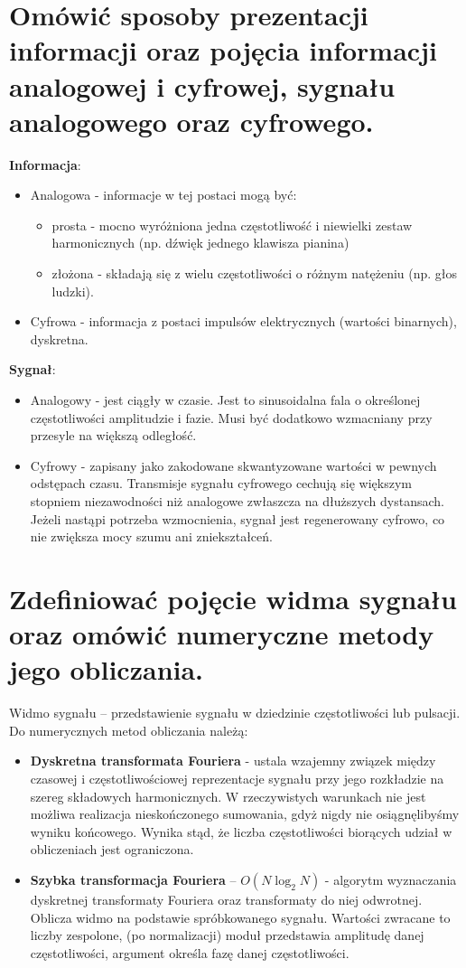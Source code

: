 \documentclass[12pt,a4paper]{article}
\begin{document}
	\section{Omówić sposoby prezentacji informacji oraz pojęcia informacji analogowej i cyfrowej, sygnału analogowego oraz cyfrowego.}
	\textbf{Informacja}:
	\begin{itemize}
		\item Analogowa - informacje w tej postaci mogą być:
		\begin{itemize}
			\item prosta - mocno wyróżniona jedna częstotliwość i niewielki zestaw harmonicznych (np. dźwięk jednego klawisza pianina)
			\item złożona - składają się z wielu częstotliwości o różnym natężeniu (np. głos ludzki).
		\end{itemize}
		\item Cyfrowa - informacja z postaci impulsów elektrycznych (wartości binarnych), dyskretna.
	\end{itemize}
	\textbf{Sygnał}:
	\begin{itemize}
		\item Analogowy - jest ciągły w czasie. Jest to sinusoidalna fala o określonej częstotliwości amplitudzie i fazie. Musi być dodatkowo wzmacniany przy przesyle na większą odległość.
		\item Cyfrowy - zapisany jako zakodowane skwantyzowane wartości w pewnych odstępach czasu. Transmisje sygnału cyfrowego cechują się większym stopniem niezawodności niż analogowe zwłaszcza na dłuższych dystansach. Jeżeli nastąpi potrzeba wzmocnienia, sygnał jest regenerowany cyfrowo, co nie zwiększa mocy szumu ani zniekształceń.
	\end{itemize}


	\section{Zdefiniować pojęcie widma sygnału oraz omówić numeryczne metody jego obliczania.}
	Widmo sygnału – przedstawienie sygnału w dziedzinie częstotliwości lub pulsacji. Do numerycznych metod obliczania należą:
	\begin{itemize}
		\item \textbf{Dyskretna transformata Fouriera} - ustala wzajemny związek między czasowej i częstotliwościowej reprezentacje sygnału przy jego  rozkładzie na szereg składowych harmonicznych. W rzeczywistych warunkach nie jest możliwa realizacja nieskończonego sumowania, gdyż nigdy nie osiągnęlibyśmy wyniku końcowego.
Wynika stąd, że liczba częstotliwości biorących udział w obliczeniach jest ograniczona.
		\item \textbf{Szybka transformacja Fouriera} – $O(N\log _{2}N)$ - algorytm wyznaczania dyskretnej transformaty Fouriera oraz transformaty do niej odwrotnej. Oblicza widmo na podstawie spróbkowanego sygnału. Wartości zwracane to liczby zespolone, (po normalizacji) moduł przedstawia amplitudę danej częstotliwości, argument określa fazę danej częstotliwości.
	\end{itemize}
\end{document}
